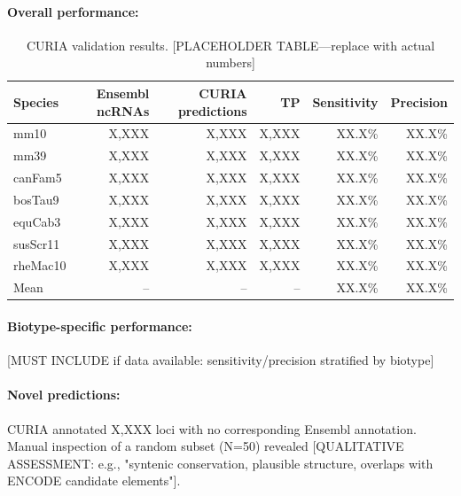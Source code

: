 \documentclass[11pt]{article}
\begin{document}

\paragraph{Overall performance:}
\begin{table}[h]
\centering
\caption{CURIA validation results. [PLACEHOLDER TABLE—replace with actual numbers]}
\label{tab:results}
\begin{tabular}{lrrrrr}
\toprule
Species & Ensembl ncRNAs & CURIA predictions & TP & Sensitivity & Precision \\
\midrule
mm10     & X,XXX & X,XXX & X,XXX & XX.X\% & XX.X\% \\
mm39     & X,XXX & X,XXX & X,XXX & XX.X\% & XX.X\% \\
canFam5  & X,XXX & X,XXX & X,XXX & XX.X\% & XX.X\% \\
bosTau9  & X,XXX & X,XXX & X,XXX & XX.X\% & XX.X\% \\
equCab3  & X,XXX & X,XXX & X,XXX & XX.X\% & XX.X\% \\
susScr11 & X,XXX & X,XXX & X,XXX & XX.X\% & XX.X\% \\
rheMac10 & X,XXX & X,XXX & X,XXX & XX.X\% & XX.X\% \\
\midrule
Mean     & -- & -- & -- & XX.X\% & XX.X\% \\
\bottomrule
\end{tabular}
\end{table}

\paragraph{Biotype-specific performance:}
[MUST INCLUDE if data available: sensitivity/precision stratified by biotype]

\paragraph{Novel predictions:}
CURIA annotated X,XXX loci with no corresponding Ensembl annotation. Manual inspection of a random subset (N=50) revealed [QUALITATIVE ASSESSMENT: e.g., "syntenic conservation, plausible structure, overlaps with ENCODE candidate elements"].
\end{document}
